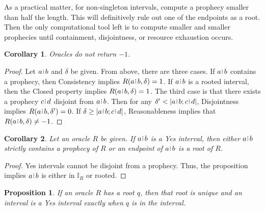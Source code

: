 \documentclass[12pt]{article}
\newtheorem{corollary}{Corollary}[section]
\newtheorem{proposition}{Proposition}[section]
\begin{document}
As a practical matter, for non-singleton intervals, compute a prophecy smaller than half the length. This will definitively rule out one of the endpoints as a root. Then the only computational tool left is to compute smaller and smaller prophecies until containment, disjointness, or resource exhaustion occurs. 

\begin{corollary}
    Oracles do not return $-1$.
\end{corollary}

\begin{proof}
    Let $a \rint b$ and $\delta$ be given. From above, there are three cases. If $a\rint b$ contains a prophecy, then Consistency implies $R(a\rint b, \delta)=1$. If $a \rint b$ is a rooted interval, then the Closed property implies $R(a \rint b, \delta)=1$. The third case is that there exists a prophecy $c \rint d$ disjoint from $a \rint b$. Then for any $\delta' < |a \rint b; c \rint d|$, Disjointness implies $R(a \rint b, \delta') = 0$. If $\delta \geq |a \rint b; c \rint d|$, Reasonableness implies that $R(a \rint b, \delta) \neq -1$.

\end{proof}


\begin{corollary}\label{os-yescat}
    Let an oracle $R$ be given. If $a\rint b$ is a Yes interval, then either $a\rint b$ strictly contains a prophecy of $R$ or an endpoint of $a\rint b$ is a root of $R$. 
\end{corollary}

\begin{proof}
    Yes intervals cannot be disjoint from a prophecy. Thus, the proposition implies $a \rint b$ is either in $\mathbb{I}_R$ or rooted. 
\end{proof}

\begin{proposition}\label{os-singular}
    If an oracle $R$ has a root $q$, then that root is unique and an interval is a Yes interval exactly when $q$ is in the interval.
\end{proposition}
\end{document}
